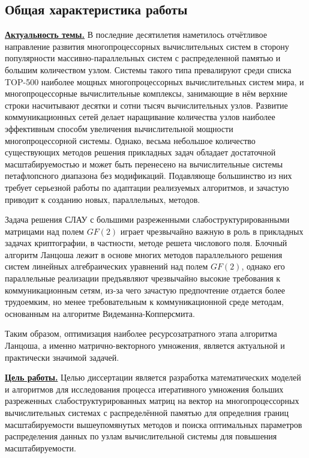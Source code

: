 \subsection*{\Large Общая характеристика работы}
\fontsize{14pt}{15pt}\selectfont
\underline{\textbf{Актуальность темы.}}
В последние десятилетия наметилось отчётливое направление развития многопроцессорных вычислительных систем в сторону
популярности массивно-параллельных систем с распределенной памятью и большим количеством узлом. Системы такого типа
превалируют среди списка TOP-500 наиболее мощных многопроцессорных вычислительных систем мира, и многопроцессорные
вычислительные комплексы, занимающие в нём верхние строки насчитывают десятки и сотни тысяч вычислительных узлов.
Развитие коммуникационных сетей делает наращивание количества узлов наиболее эффективным способм увеличения
вычислительной мощности  многопроцессорной системы. Однако, весьма небольшое количество существующих методов решения прикладных задач
обладает достаточной масштабируемостью и может быть перенесено на вычислительные системы петафлопсного диапазона без
 модификаций. Подавляюще большинство из них требует серьезной работы по адаптации реализуемых алгоритмов, и зачастую
 приводит к созданию новых, параллельных, методов.

 Задача решения СЛАУ с большими разреженными слабоструктурированными матрицами над полем $GF(2)$ играет чрезвычайно
 важную в роль в прикладных задачах криптографии, в частности, методе решета числового поля. Блочный алгоритм Ланцоша
 лежит в основе многих методов параллельного решения систем линейных алгебраических уравнений над полем $GF(2)$, однако
 его параллельные реализации  предъявляют чрезвычайно  высокие требования к коммуникационным сетям, из-за чего зачастую
 предпочтение отдается более трудоемким, но менее требовательным к коммуникационной среде методам, основанным на
 алгоритме Видеманна-Копперсмита. 

 Таким образом, оптимизация наиболее ресурсозатратного этапа алгоритма Ланцоша, а именно матрично-векторного умножения,
 является актуальной и практически значимой задачей.

\underline{\textbf{Цель работы.}} Целью диссертации является разработка математических моделей и алгоритмов для
исследования процесса итеративного умножения больших разреженных слабоструктурированных матриц на вектор на
многопроцессорных вычислительных системах с распределённой памятью для определния границ масштабируемости вышеупомянутых
методов и поиска оптимальных параметров распределения данных по узлам вычислительной системы для повышения
масштабируемости.

